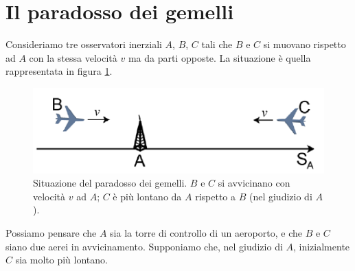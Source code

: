 \section{Il paradosso dei gemelli}

Consideriamo tre osservatori inerziali $A$, $B$, $C$ tali che $B$ e $C$ si muovano
rispetto ad $A$ con la stessa velocità $v$ ma da parti opposte. La situazione è
quella rappresentata in figura \ref{gemelli1}.

\begin{figure}[htbp]
   \centering
   \includegraphics[scale=1]{immagini/conferme_relspec/gemelli1}
   \caption{\label{gemelli1}Situazione del paradosso dei gemelli. $B$ e $C$ si avvicinano con
velocità $v$ ad $A$; $C$ è più lontano da $A$ rispetto a $B$ (nel giudizio di $A$).}
\end{figure}

Possiamo pensare che $A$ sia la torre di controllo di un aeroporto, e che
$B$ e $C$ siano due aerei in avvicinamento. Supponiamo che, nel giudizio di $A$,
inizialmente $C$ sia molto più lontano.

